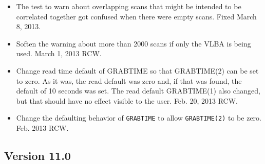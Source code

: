 \documentclass{report}
\begin{document}
\begin{itemize}
\item The test to warn about overlapping scans that might be intended
to be correlated together got confused when there were empty scans.
Fixed March 8, 2013.

\item Soften the warning about more than 2000 scans if only the
VLBA is being used.  March 1, 2013  RCW.

\item Change read time default of GRABTIME so that GRABTIME(2) can
be set to zero.  As it was, the read default was zero and, if that
was found, the default of 10 seconds was set.  The read default
GRABTIME(1) also changed, but that should have no effect visible to
the user.  Feb. 20, 2013  RCW.

\item Change the defaulting behavior of {\tt GRABTIME} to allow
{\tt GRABTIME(2)} to be zero.  Feb. 2013  RCW.

\end{itemize}


\subsection{\label{SSEC:VER_11.0}Version 11.0}
\end{document}
